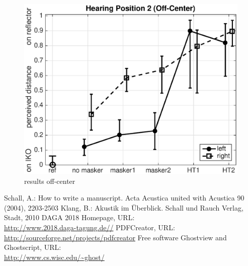 \documentclass[a4paper, 10pt, twocolumn]{article}
\begin{document}
\begin{figure}[ht]
	\centering
	\includegraphics[scale=0.5]{./figures/offcenter.eps}
	\caption{results off-center}
\end{figure}

\begin{thebibliography}{5}
Schall, A.: How to write a manuscript. Acta Acustica united with
Acustica 90 (2004), 2203-2503
Klang, B.: Akustik im Überblick. Schall und Rauch Verlag, Stadt,
2010
DAGA 2018 Homepage, URL:\\
\url{http://www.2018.daga-tagung.de//}
PDFCreator, URL:\\
\url{http://sourceforge.net/projects/pdfcreator}
Free software Ghostview and Ghostscript, URL:\\
\url{http://www.cs.wisc.edu/~ghost/}
\end{thebibliography}
\end{document}
